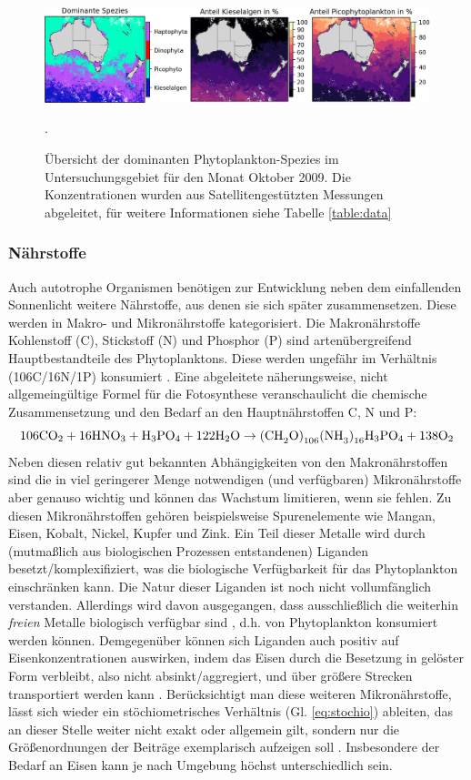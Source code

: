 \documentclass[12pt,a4paper,onecolumn,headheight=30pt]{scrartcl}
\newcommand{\cotwo}{CO\textsubscript{2}}
\begin{document}
\begin{figure}[htbp]
\includegraphics[width=\textwidth]{bilder/dominant_diatom_pico.png}
\caption{Übersicht der dominanten Phytoplankton-Spezies im Untersuchungsgebiet für den Monat Oktober 2009. Die Konzentrationen wurden aus Satellitengestützten Messungen abgeleitet, für weitere Informationen siehe Tabelle \ref{table:data}}. \label{fig:dominant_diatom_pico}
\end{figure}
\subsubsection{Nährstoffe} \label{sec:nährstoffe}
Auch autotrophe Organismen benötigen zur Entwicklung neben dem einfallenden Sonnenlicht weitere Nährstoffe, aus denen sie sich später zusammensetzen. Diese werden in Makro- und Mikronährstoffe kategorisiert. Die Makronährstoffe Kohlenstoff (C), Stickstoff (N) und Phosphor (P) sind artenübergreifend  Hauptbestandteile des Phytoplanktons. Diese werden ungefähr im Verhältnis (106C/16N/1P) konsumiert \citep{Falkowski.1998}. Eine abgeleitete näherungsweise, nicht allgemeingültige Formel für die Fotosynthese  \citep{Emerson.2009} veranschaulicht die chemische Zusammensetzung und den Bedarf an den Hauptnährstoffen C, N und P:
\begin{equation}
\text{106\cotwo} + \text{16HNO}_3 + \text{H}_3\text{PO}_4 + \text{122H}_2\text{O} \rightarrow \text{(CH}_2\text{O)}_{106}\text{(NH}_3\text{)}_{16}\text{H}_3\text{PO}_4 + \text{138O}_2
\end{equation}
Neben diesen relativ gut bekannten Abhängigkeiten von den Makronährstoffen sind die in viel geringerer Menge notwendigen (und verfügbaren) Mikronährstoffe aber genauso wichtig und können das Wachstum limitieren, wenn sie fehlen. Zu diesen Mikronährstoffen gehören beispielsweise Spurenelemente wie Mangan, Eisen, Kobalt, Nickel, Kupfer und Zink. Ein Teil dieser Metalle wird durch (mutmaßlich aus biologischen Prozessen entstandenen) Liganden besetzt/komplexifiziert, was die biologische Verfügbarkeit für das Phytoplankton einschränken kann. Die Natur dieser Liganden ist noch nicht vollumfänglich verstanden. Allerdings wird davon ausgegangen, dass ausschließlich die weiterhin \textit{freien} Metalle biologisch verfügbar sind \citep{Emerson.2009}, d.h. von Phytoplankton konsumiert werden können. Demgegenüber können sich Liganden auch positiv auf Eisenkonzentrationen auswirken, indem das Eisen durch die Besetzung in gelöster Form verbleibt, also nicht absinkt/aggregiert, und über größere Strecken transportiert werden kann \citep{Tagliabue.2017}. Berücksichtigt man diese weiteren Mikronährstoffe, lässt sich wieder ein stöchiometrisches Verhältnis (Gl. \ref{eq:stochio}) ableiten, das an dieser Stelle weiter nicht exakt oder allgemein gilt, sondern nur die Größenordnungen der Beiträge exemplarisch aufzeigen soll \citep{Emerson.2009}. Insbesondere der Bedarf an Eisen kann je nach Umgebung höchst unterschiedlich sein.
\end{document}
